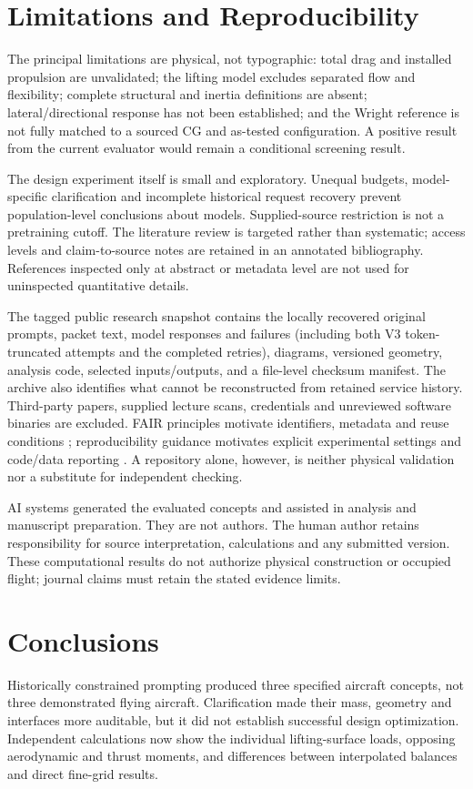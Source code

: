 \documentclass[11pt,a4paper]{article}
\begin{document}
\section{Limitations and Reproducibility}
The principal limitations are physical, not typographic: total drag and installed propulsion are unvalidated; the lifting model excludes separated flow and flexibility; complete structural and inertia definitions are absent; lateral/directional response has not been established; and the Wright reference is not fully matched to a sourced CG and as-tested configuration. A positive result from the current evaluator would remain a conditional screening result.

The design experiment itself is small and exploratory. Unequal budgets, model-specific clarification and incomplete historical request recovery prevent population-level conclusions about models. Supplied-source restriction is not a pretraining cutoff. The literature review is targeted rather than systematic; access levels and claim-to-source notes are retained in an annotated bibliography. References inspected only at abstract or metadata level are not used for uninspected quantitative details.

The tagged public research snapshot contains the locally recovered original prompts, packet text, model responses and failures (including both V3 token-truncated attempts and the completed retries), diagrams, versioned geometry, analysis code, selected inputs/outputs, and a file-level checksum manifest. The archive also identifies what cannot be reconstructed from retained service history. Third-party papers, supplied lecture scans, credentials and unreviewed software binaries are excluded. FAIR principles motivate identifiers, metadata and reuse conditions \cite{ref33}; reproducibility guidance motivates explicit experimental settings and code/data reporting \cite{ref34}. A repository alone, however, is neither physical validation nor a substitute for independent checking.

AI systems generated the evaluated concepts and assisted in analysis and manuscript preparation. They are not authors. The human author retains responsibility for source interpretation, calculations and any submitted version. These computational results do not authorize physical construction or occupied flight; journal claims must retain the stated evidence limits.

\section{Conclusions}
Historically constrained prompting produced three specified aircraft concepts, not three demonstrated flying aircraft. Clarification made their mass, geometry and interfaces more auditable, but it did not establish successful design optimization. Independent calculations now show the individual lifting-surface loads, opposing aerodynamic and thrust moments, and differences between interpolated balances and direct fine-grid results.
\end{document}
